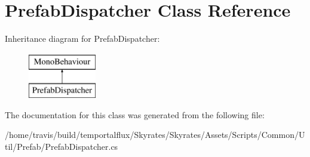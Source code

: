 \hypertarget{class_prefab_dispatcher}{\section{Prefab\-Dispatcher Class Reference}
\label{class_prefab_dispatcher}
}
Inheritance diagram for Prefab\-Dispatcher\-:\begin{figure}[H]
\begin{center}
\leavevmode
\includegraphics[height=2.000000cm]{class_prefab_dispatcher}
\end{center}
\end{figure}


The documentation for this class was generated from the following file\-:\begin{DoxyCompactItemize}
\item 
/home/travis/build/temportalflux/\-Skyrates/\-Skyrates/\-Assets/\-Scripts/\-Common/\-Util/\-Prefab/Prefab\-Dispatcher.\-cs\end{DoxyCompactItemize}
